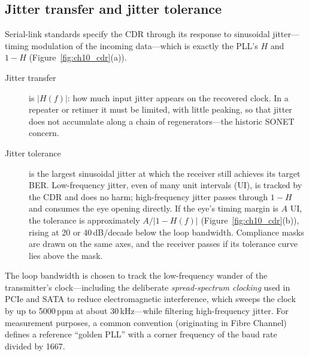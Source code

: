 
\subsection{Jitter transfer and jitter tolerance}

Serial-link standards specify the CDR through its response to sinusoidal jitter---timing modulation of
the incoming data---which is exactly the PLL's $H$ and $1-H$ (Figure~\ref{fig:ch10_cdr}(a)).
\begin{description}
\item[Jitter transfer] is $|H(f)|$: how much input jitter appears on the recovered clock. In a
repeater or retimer it must be limited, with little peaking, so that jitter does not accumulate
along a chain of regenerators---the historic SONET concern.
\item[Jitter tolerance] is the largest sinusoidal jitter at which the receiver still achieves its
target BER. Low-frequency jitter, even of many unit intervals (UI), is tracked by the CDR and does no
harm; high-frequency jitter passes through $1-H$ and consumes the eye opening directly. If the
eye's timing margin is $A$ UI, the tolerance is approximately $A/|1-H(f)|$ (Figure~\ref{fig:ch10_cdr}(b)),
rising at 20 or 40\,dB/decade below the loop bandwidth. Compliance masks are drawn on the same axes,
and the receiver passes if its tolerance curve lies above the mask.
\end{description}
The loop bandwidth is chosen to track the low-frequency wander of the transmitter's clock---including
the deliberate \emph{spread-spectrum clocking} used in PCIe and SATA to reduce electromagnetic
interference, which sweeps the clock by up to 5000\,ppm at about 30\,kHz---while filtering high-frequency
jitter. For measurement purposes, a common convention (originating in Fibre Channel) defines a
reference ``golden PLL'' with a corner frequency of the baud rate divided by 1667.


